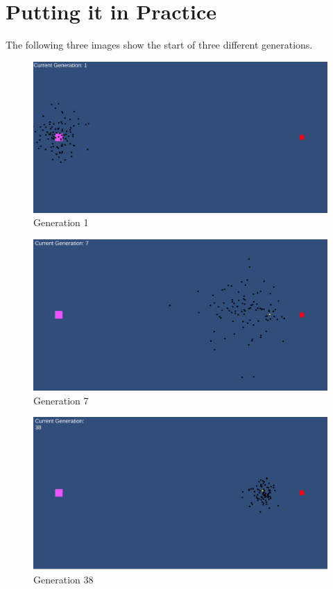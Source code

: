 \documentclass[twoside]{article}
\begin{document}
    \section{Putting it in Practice}\label{sec:putting-it-in-practice}
    The following three images show the start of three different generations.
    \begin{figure}[hbtp]
        \centering
        \includegraphics[scale=0.2]{Basic Training - Generation 1}
        \caption {Generation 1}
        \label{fig:Gen1Basic}
    \end{figure}

    \begin{figure}[hbtp]
        \centering
        \includegraphics[scale=0.2]{Basic Training - Generation 7}
        \caption {Generation 7}
        \label{fig:Gen7Basic}
    \end{figure}

    \begin{figure}[hbtp]
        \centering
        \includegraphics[scale=0.2]{Basic Training - Generation 38}
        \caption {Generation 38}
        \label{fig:Gen38Basic}
    \end{figure}
\end{document}
